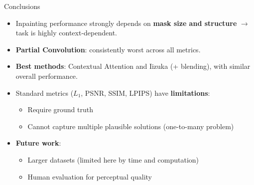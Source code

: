 \documentclass[aspectratio=43]{beamer}
\begin{document}
	\begin{frame}{Conclusions}
		
		\begin{itemize}
			\item Inpainting performance strongly depends on \textbf{mask size and structure} $\rightarrow$ task is highly context-dependent.
			
			\item \textbf{Partial Convolution}: consistently worst across all metrics.
			
			\item \textbf{Best methods}: Contextual Attention and Iizuka (+ blending), with similar overall performance.
			
			\item Standard metrics ($L_1$, PSNR, SSIM, LPIPS) have \textbf{limitations}:
			\vspace{-0.4cm}
			\begin{itemize}
				\item Require ground truth
				\item Cannot capture multiple plausible solutions (one-to-many problem)
			\end{itemize}
			
			\item \textbf{Future work}:
			\begin{itemize}
				\item Larger datasets (limited here by time and computation)
				\item Human evaluation for perceptual quality
			\end{itemize}
		\end{itemize}
		
	\end{frame}
	
	
	
\end{document}
